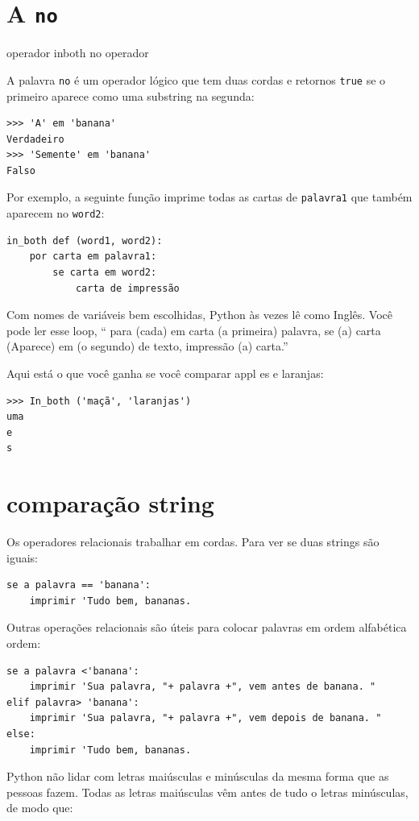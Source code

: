 \documentclass[10pt]{book}
\begin{document}
\section{A {\tt no}} operador
\label{} inboth
\index{} no operador

A palavra {\tt no} é um operador lógico que tem duas cordas e
retornos {\tt true} se o primeiro aparece como uma substring na segunda:

\begin{verbatim}
>>> 'A' em 'banana'
Verdadeiro
>>> 'Semente' em 'banana'
Falso
\end{verbatim}
%
Por exemplo, a seguinte função imprime todas as
cartas de {\tt palavra1} que também aparecem no {\tt word2}:

\begin{verbatim}
in_both def (word1, word2):
    por carta em palavra1:
        se carta em word2:
            carta de impressão
\end{verbatim}
%
Com nomes de variáveis ​​bem escolhidas,
Python às vezes lê como Inglês. Você pode ler
esse loop, `` para (cada) em carta (a primeira) palavra, se (a) carta 
(Aparece) em (o segundo) de texto, impressão (a) carta.''

Aqui está o que você ganha se você comparar appl es e laranjas:

\begin{verbatim}
>>> In_both ('maçã', 'laranjas')
uma
e
s
\end{verbatim}
%

\section{comparação string}

Os operadores relacionais trabalhar em cordas. Para ver se duas strings são iguais:

\begin{verbatim}
se a palavra == 'banana':
    imprimir 'Tudo bem, bananas.
\end{verbatim}
%
Outras operações relacionais são úteis para colocar palavras em ordem alfabética
ordem:

\begin{verbatim}
se a palavra <'banana':
    imprimir 'Sua palavra, "+ palavra +", vem antes de banana. "
elif palavra> 'banana':
    imprimir 'Sua palavra, "+ palavra +", vem depois de banana. "
else:
    imprimir 'Tudo bem, bananas.
\end{verbatim}
%
Python não lidar com letras maiúsculas e minúsculas da mesma forma
que as pessoas fazem. Todas as letras maiúsculas vêm antes de tudo o
letras minúsculas, de modo que:
\end{document}
